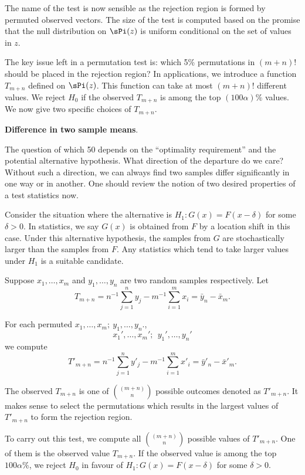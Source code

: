 The name of the test is now sensible as the rejection region is formed
by permuted observed vectors. The size of the test is computed
based on the promise that the null distribution on $\sPi(z)$ is uniform
conditional on the set of values in $z$.

The key issue left in a permutation test is: which 5\% permutations in $(m+n)!$ 
should be placed in the rejection region?
In applications, we introduce a function $T_{m+n}$ defined on
$\sPi(z)$. This function can take at most $(m+n)!$ different values.
We reject $H_0$ if the observed $T_{m+n}$ is among the top
$(100\alpha)\%$ values. We now give two specific choices of $T_{m+n}$.


\vs
\noindent
{\bf Difference in two sample means}.

The question of which 50 depends on the ``optimality requirement''
and the potential alternative hypothesis. What direction of the
departure do we care? Without such a direction, we can always find
two samples differ significantly in one way or in another.
One should review the notion of two desired properties of a test
statistics now.

Consider the situation where the alternative is $H_1: G(x) = F(x - \delta)$
for some $\delta > 0$. In statistics, we say $G(x)$ is obtained from $F$
by a location shift in this case. Under this alternative hypothesis, 
the samples from $G$ are stochastically larger than the samples from $F$.
Any statistics which tend to take larger values under $H_1$ is
a suitable candidate.

Suppose $x_1, \ldots, x_m$ and $y_1, \ldots, y_n$ are two
random samples respectively. 
Let
\[
T_{m+n} = n^{-1} \sum_{j=1}^n y_j - m^{-1} \sum_{i=1}^m x_i
=
\bar y_n - \bar x_m.
\]

For each permuted $x_1, \ldots, x_m; ~y_1, \ldots, y_n.$,
\[
x_1', \ldots, x_m'; ~~y_1', \ldots, y_n'
\]
we compute
\[
T'_{m+n} = n^{-1} \sum_{j=1}^n y'_j - m^{-1} \sum_{i=1}^m x'_i
=
\bar y'_n - \bar x'_m.
\]

The observed $T_{m+n}$ is one of $(m+n) \choose n$ possible outcomes
denoted as $T'_{m+n}$.
It makes sense to select the permutations which results in
the largest values of $T'_{m+n}$ to form the rejection region.
 
To carry out this test, we compute all $(m+n) \choose n$ possible
values of $T'_{m+n}$. One of them is the observed value
$T_{m+n}$. If the observed value is among the top $100\alpha\%$,
we reject $H_0$ in favour of $H_1: G(x) = F(x - \delta)$
for some $\delta > 0$.

